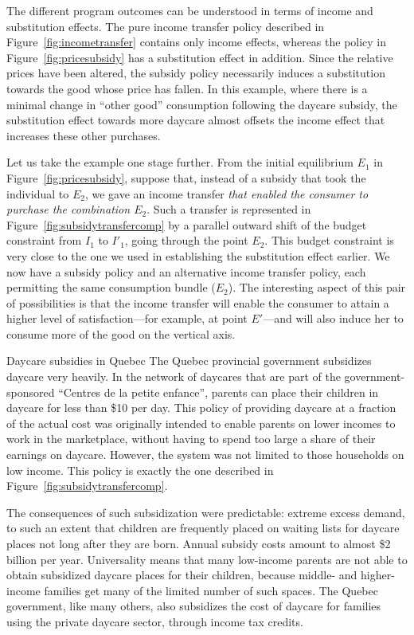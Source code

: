 The different program outcomes can be understood in terms of income and substitution effects. The pure income transfer policy described in Figure~\ref{fig:incometransfer} contains only income effects, whereas the policy in Figure~\ref{fig:pricesubsidy} has a substitution effect in addition. Since the relative prices have been altered, the subsidy policy necessarily induces a substitution towards the good whose price has fallen. In this example, where there is a minimal change in ``other good'' consumption following the daycare subsidy, the substitution effect towards more daycare almost offsets the income effect that increases these other purchases.

Let us take the example one stage further. From the initial equilibrium $E_1$ in Figure~\ref{fig:pricesubsidy}, suppose that, instead of a subsidy that took the individual to $E_2$, we gave an income transfer \textit{that enabled the consumer to purchase the combination $E_2$}. Such a transfer is represented in Figure~\ref{fig:subsidytransfercomp} by a parallel outward shift of the budget constraint from $I_1$ to $I'_1$, going through the point $E_2$. This budget constraint is very close to the one we used in establishing the substitution effect earlier. We now have a subsidy policy and an alternative income transfer policy, each permitting the same consumption bundle ($E_2$). The interesting aspect of this pair of possibilities is that the income transfer will enable the consumer to attain a higher level of satisfaction---for example, at point $E'$---and will also induce her to consume more of the good on the vertical axis.



\begin{ApplicationBox}{Daycare subsidies in Quebec \label{app:daycarequebec}}
The Quebec provincial government subsidizes daycare very heavily. In the network of daycares that are part of the government-sponsored ``Centres de la petite enfance'', parents can place their children in daycare for less than \$10 per day. This policy of providing daycare at a fraction of the actual cost was originally intended to enable parents on lower incomes to work in the marketplace, without having to spend too large a share of their earnings on daycare. However, the system was not limited to those households on low income. This policy is exactly the one described in Figure~\ref{fig:subsidytransfercomp}.

\bigskip
The consequences of such subsidization were predictable: extreme excess demand, to such an extent that children are frequently placed on waiting lists for daycare places not long after they are born. Annual subsidy costs amount to almost \$2 billion per year. Universality means that many low-income parents are not able to obtain subsidized daycare places for their children, because middle- and higher-income families get many of the limited number of such spaces. The Quebec government, like many others, also subsidizes the cost of daycare for families using the private daycare sector, through income tax credits.
\end{ApplicationBox}

